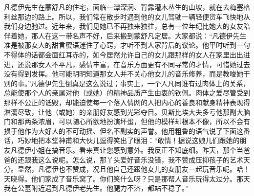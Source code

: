 \par 凡德伊先生在蒙舒凡的住宅，面临一潭深涧、背靠灌木丛生的山坡，就在去梅塞格利丝那边的路上。所以，我们常在散步时遇到他的女儿驾驶一辆轻便货车飞快地从我们身边驰过。近年来，我们见她已不再独来独往，总有一位年纪比她大的女友陪伴着她，那人在这一带名声不好，后来搬到蒙舒凡定居。大家都说：“凡德伊先生准是被那女人的甜言蜜语迷住了心窍，才听不到人家背后的议论。他平时听到一句不得体的话都会面红耳赤的，如今居然允许自己的女儿跟那样的女人在家里出出进进，还说那女人不平凡，感情丰富，在音乐方面更有不同寻常的才情，可惜她过去没有得到发挥。他可能明明知道那女人并不关心他女儿的音乐修养，而是教唆她干别的事。”凡德伊先生倒真是这么说过；事实上，一个人凡同谁有过肉体上的关系，总能使那个人的亲属对他（或她）的精神品质产生由衷的钦佩。肉体之爱尽管受到那样不公正的诋毁，却能迫使每一个落入情网的人把内心的善良和献身精神表现得淋漓尽致，让他（或她）的亲朋好友感到光彩夺目。贝斯比埃大夫多亏他那副大脑门和那两条浓眉，可以随心所欲地扮演坏蛋，但他的模样却根本不像，所以不会有损于他作为大好人的不可动摇、但名不副实的声誉。他用粗鲁的语气说了下面这番话，巧妙地把本堂神甫和大伙儿逗得笑出了眼泪：“敢情！据说这娘儿们跟她的朋友凡德伊小姐在搞音乐。看来真让您感到意外。我反正不知底细。昨天，那个当爸爸的还跟我这么说呢。怎么说，那丫头爱好音乐没错，我不赞成压抑孩子的艺术天分。显然，凡德伊也不赞成，况且他自己还跟他女儿的女朋友一起玩音乐呢。哈！天晓得。他们家成了音乐窝了。你们笑什么呀？只是那帮人音乐玩得太过分。那天我在公墓附近遇到凡德伊老先生。他腿力不济，都站不稳了。”
